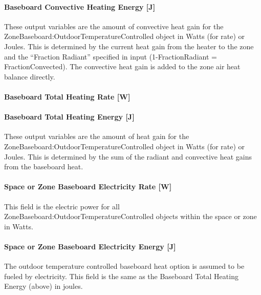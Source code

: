 \paragraph{Baseboard Convective Heating Energy {[}J{]}}\label{baseboard-convective-heating-energy-j}

These output variables are the amount of convective heat gain for the Zone\-Baseboard:\-Outdoor\-Temperature\-Controlled object in Watts (for rate) or Joules. This is determined by the current heat gain from the heater to the zone and the ``Fraction Radiant'' specified in input (1-FractionRadiant = FractionConvected). The convective heat gain is added to the zone air heat balance directly.

\paragraph{Baseboard Total Heating Rate {[}W{]}}\label{baseboard-total-heating-rate-w}

\paragraph{Baseboard Total Heating Energy {[}J{]}}\label{baseboard-total-heating-energy-j}

These output variables are the amount of heat gain for the Zone\-Baseboard:\-Outdoor\-Temperature\-Controlled object in Watts (for rate) or Joules. This is determined by the sum of the radiant and convective heat gains from the baseboard heat.

\paragraph{Space or Zone Baseboard Electricity Rate {[}W{]}}\label{zone-baseboard-electric-power-w}

This field is the electric power for all Zone\-Baseboard:\-Outdoor\-Temperature\-Controlled objects within the space or zone in Watts.

\paragraph{Space or Zone Baseboard Electricity Energy {[}J{]}}\label{zone-baseboard-electric-energy-j}

The outdoor temperature controlled baseboard heat option is assumed to be fueled by electricity. This field is the same as the Baseboard Total Heating Energy (above) in joules. 

